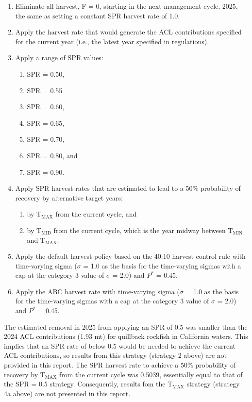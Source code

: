 \documentclass[11pt,
  letterpaper,
]{article}
\begin{document}
\begin{enumerate}
    \item Eliminate all harvest, F = 0, starting in the next management cycle, 2025, the same as setting a constant SPR harvest rate of 1.0.
    \item Apply the harvest rate that would generate the ACL contributions specified for the current year (i.e., the latest year specified in regulations). 
    \item Apply a range of SPR values: 
    \begin{enumerate}
     \item SPR = 0.50,
     \item SPR = 0.55
     \item SPR = 0.60,
     \item SPR = 0.65,
     \item SPR = 0.70,
     \item SPR = 0.80, and
     \item SPR = 0.90. 
    \end{enumerate}
    \item Apply SPR harvest rates that are estimated to lead to a 50$\%$ probability of recovery by alternative target years: 
    \begin{enumerate}
     \item by $\text{T}_\text{MAX}$ from the current cycle, and 
     \item by $\text{T}_\text{MID}$ from the current cycle, which is the year midway between $\text{T}_\text{MIN}$ and $\text{T}_\text{MAX}$.
    \end{enumerate}
    \item Apply the default harvest policy based on the 40:10 harvest control rule with time-varying sigma ($\sigma$ = 1.0 as the basis for the time-varying sigmas with a cap at the category 3 value of $\sigma$ = 2.0) and $P^*$ = 0.45.
    \item Apply the ABC harvest rate with time-varying sigma ($\sigma$ = 1.0 as the basis for the time-varying sigmas with a cap at the category 3 value of $\sigma$ = 2.0) and $P^*$ = 0.45.
\end{enumerate}

The estimated removal in 2025 from applying an SPR of 0.5 was smaller than the 2024 ACL contributions (1.93 mt) for quillback rockfish in California waters. This implies that an SPR rate of below 0.5 would be needed to achieve the current ACL contributions, so results from this strategy (strategy 2 above) are not provided in this report. The SPR harvest rate to achieve a 50\(\%\) probability of recovery by \(\text{T}_\text{MAX}\) from the current cycle was 0.5039, essentially equal to that of the SPR = 0.5 strategy. Consequently, results fom the \(\text{T}_\text{MAX}\) strategy (strategy 4a above) are not presented in this report.
\end{document}
